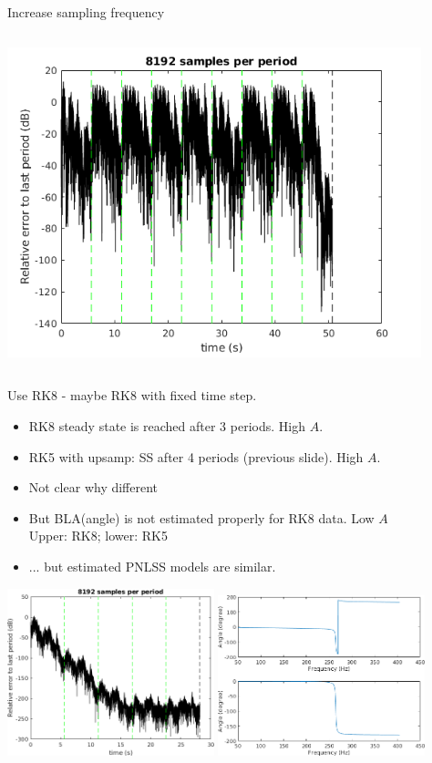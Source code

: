 \documentclass[9pt]{beamer}
\begin{document}
\begin{frame}{Increase sampling frequency}
\begin{columns}
\begin{column}{0.5\textwidth}
\begin{center}
        \includegraphics[width=0.9\textwidth]{fig/b1_A30_ms_full2_periodicity}
      \end{center}
    \end{column}
  \end{columns}
\end{frame}


\begin{frame}{Use RK8 - maybe}
  RK8 with fixed time step.
  \begin{itemize}
  \item RK8 steady state is reached after 3 periods. High $A$.
  \item RK5 with upsamp: SS after 4 periods (previous slide). High $A$.
  \item Not clear why different
  \item But BLA(angle) is not estimated properly for RK8 data. Low $A$\\
    Upper: RK8; lower: RK5
  \item ... but estimated PNLSS models are similar.
  \end{itemize}
  \begin{center}
    \includegraphics[width=0.45\textwidth]{fig/b1_A30_ode8_periodicity}
    \includegraphics[width=0.45\textwidth]{fig/angle_rk8_rk5}
 \end{center}
\end{frame}
\end{document}
